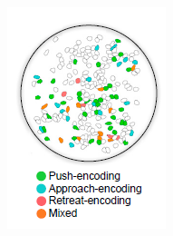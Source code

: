 \documentclass[a4paper]{article}
\begin{document}
\begin{figure}[H]
	\begin{minipage}{\linewidth}
		\centering
		\begin{minipage}{0.4\linewidth}
			\begin{figure}[H]
				\includegraphics[width=\linewidth]{kingsbury2.png}
				

\end{figure}
\end{minipage}
\end{minipage}
\end{figure}
\end{document}
